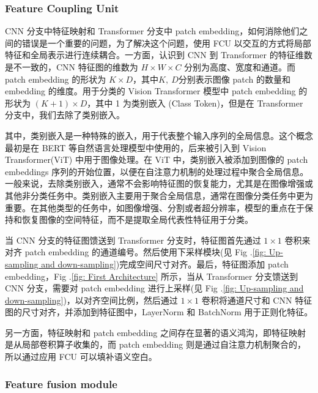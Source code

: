 \documentclass[a4paper, 10pt]{article}
\begin{document}
		\subsubsection{Feature Coupling Unit}
		
		CNN 分支中特征映射和 Transformer 分支中 patch embedding，如何消除他们之间的错误是一个重要的问题，为了解决这个问题，使用 FCU 以交互的方式将局部特征和全局表示进行连续耦合。一方面，认识到 CNN 到 Transformer 的特征维数是不一致的，CNN 特征图的维数为 $H \times W \times C$ 分别为高度、宽度和通道。而 patch embedding 的形状为 $K \times D$，其中$K, \ D$分别表示图像 patch 的数量和 embedding 的维度。用于分类的 Vision Transformer 模型中 patch embedding 的形状为 $\left( K + 1 \right) \times D$，其中 1 为类别嵌入 (Class Token)，但是在 Transformer 分支中，我们去除了类别嵌入。
		
		其中，类别嵌入是一种特殊的嵌入，用于代表整个输入序列的全局信息。这个概念最初是在 BERT 等自然语言处理模型中使用的，后来被引入到 Vision Transformer(ViT) 中用于图像处理。在 ViT 中，类别嵌入被添加到图像的 patch embeddings 序列的开始位置，以便在自注意力机制的处理过程中聚合全局信息。一般来说，去除类别嵌入，通常不会影响特征图的恢复能力，尤其是在图像增强或其他非分类任务中。类别嵌入主要用于聚合全局信息，通常在图像分类任务中更为重要。在其他类型的任务中，如图像增强、分割或者超分辨率，模型的重点在于保持和恢复图像的空间特征，而不是提取全局代表性特征用于分类。
		
		当 CNN 分支的特征图馈送到 Transformer 分支时，特征图首先通过 $1 \times 1$ 卷积来对齐 patch embedding 的通道编号。然后使用下采样模块(见 Fig .\ref{fig: Up-sampling and down-sampling})完成空间尺寸对齐。最后，特征图添加 patch embedding，Fig .\ref{fig: First Architecture} 所示，当从 Transformer 分支馈送到 CNN 分支，需要对 patch embedding 进行上采样(见 Fig .\ref{fig: Up-sampling and down-sampling})，以对齐空间比例，然后通过 $1 \times 1$ 卷积将通道尺寸和 CNN 特征图的尺寸对齐，并添加到特征图中，LayerNorm 和 BatchNorm 用于正则化特征。
		
		另一方面，特征映射和 patch embedding 之间存在显著的语义鸿沟，即特征映射是从局部卷积算子收集的，而 patch embedding 则是通过自注意力机制聚合的，所以通过应用 FCU 可以填补语义空白。
		
		\subsubsection{Feature fusion module}
		
\end{document}

